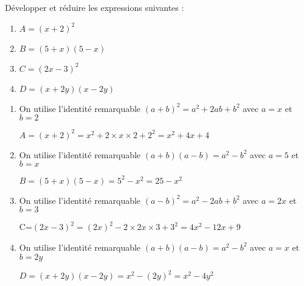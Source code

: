 
Développer et réduire les expressions suivantes :
\begin{enumerate}
     \item
     $A=\left(x+2\right)^{2}$
     \item
     $B=\left(5+x\right)\left(5-x\right)$
     \item
     $C=\left(2x-3\right)^{2}$
     \item
     $D=\left(x+2y\right)\left(x-2y\right)$
\end{enumerate}
\begin{corrige}
     \begin{enumerate}
          \item
          On utilise l'identité remarquable $\left(a+b\right)^{2}=a^{2}+2ab+b^{2}$ avec $a=x$ et $b=2$
          \par
          $A=\left(x+2\right)^{2}=x^{2}+2\times x\times 2+2^{2}=x^{2}+4x+4$
          \item
          On utilise l'identité remarquable $\left(a+b\right)\left(a-b\right)=a^{2}-b^{2}$ avec $a=5$ et $b=x$
          \par
          $B=\left(5+x\right)\left(5-x\right)=5^{2}-x^{2}=25-x^{2}$
          \item
          On utilise l'identité remarquable $\left(a-b\right)^{2}=a^{2}-2ab+b^{2}$ avec $a=2x$ et $b=3$
          \par
          C=$\left(2x-3\right)^{2}=\left(2x\right)^{2}-2\times 2x\times 3+3^{2}=4x^{2}-12x+9$
          \item
          On utilise l'identité remarquable $\left(a+b\right)\left(a-b\right)=a^{2}-b^{2}$ avec $a=x$ et $b=2y$
          \par
          $D=\left(x+2y\right)\left(x-2y\right)=x^{2}-\left(2y\right)^{2}=x^{2}-4y^{2}$
     \end{enumerate}
\end{corrige}


